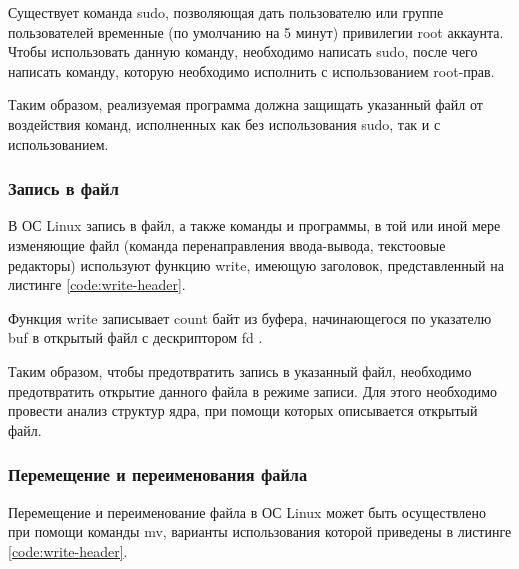 Существует команда sudo, позволяющая дать пользователю или группе пользователей временные (по умолчанию на 5 минут) привилегии root аккаунта. Чтобы использовать данную команду, необходимо написать sudo, после чего написать команду, которую необходимо исполнить с использованием root-прав.

Таким образом, реализуемая программа должна защищать указанный файл от воздействия команд, исполненных как без использования sudo, так и с использованием.

\subsubsection{Запись в файл}

В ОС Linux запись в файл, а также команды и программы, в той или иной мере изменяющие файл (команда перенаправления ввода-вывода, текстоовые редакторы) используют функцию write, имеющую заголовок, представленный на листинге \ref{code:write-header}.

Функция write записывает count байт из буфера, начинающегося по указателю buf в открытый файл с дескриптором fd \cite{write-manual}.

Таким образом, чтобы предотвратить запись в указанный файл, необходимо предотвратить открытие данного файла в режиме записи. Для этого необходимо провести анализ структур ядра, при помощи которых описывается открытый файл.

\subsubsection{Перемещение и переименования файла}

Перемещение и переименование файла в ОС Linux может быть осуществлено при помощи команды mv, варианты использования которой приведены в листинге \ref{code:write-header}.


